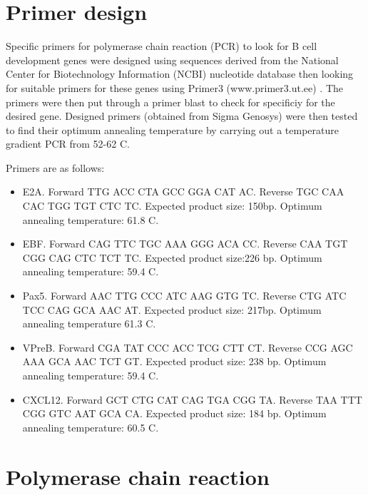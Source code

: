 \section{Primer design}

Specific primers for polymerase chain reaction (PCR) to look for B cell development genes were designed using sequences derived from the National Center for Biotechnology Information (NCBI) nucleotide database \citep{NCBIdatabase} then looking for suitable primers for these genes using Primer3 (www.primer3.ut.ee) \citep{Primer3}.
The primers were then put through a primer blast \citep{Primerblast} to check for specificiy for the desired gene. 
Designed primers (obtained from Sigma Genosys) were then tested to find their optimum annealing temperature by carrying out a temperature gradient PCR from 52-62 \textdegree C.

Primers are as follows:
\begin{itemize}
\item E2A. Forward TTG ACC CTA GCC GGA CAT AC.
Reverse TGC CAA CAC TGG TGT CTC TC.
Expected product size: 150bp.
Optimum annealing temperature: 61.8 \textdegree C.

\item EBF.
Forward CAG TTC TGC AAA GGG ACA CC.
Reverse CAA TGT CGG CAG CTC TCT TC.
Expected product size:226 bp.
Optimum annealing temperature: 59.4 \textdegree C.

\item Pax5. Forward AAC TTG CCC ATC AAG GTG TC.
Reverse CTG ATC TCC CAG GCA AAC AT.
Expected product size: 217bp.
Optimum annealing temperature 61.3 \textdegree C.

\item VPreB.
Forward CGA TAT CCC ACC TCG CTT CT.
Reverse CCG AGC AAA GCA AAC TCT GT.
Expected product size: 238 bp.
Optimum annealing temperature: 59.4 \textdegree C.

\item CXCL12.
Forward GCT CTG CAT CAG TGA CGG TA.
Reverse TAA TTT CGG GTC AAT GCA CA.
Expected product size: 184 bp.
Optimum annealing temperature: 60.5 \textdegree C.
\end{itemize}

\section{Polymerase chain reaction}

